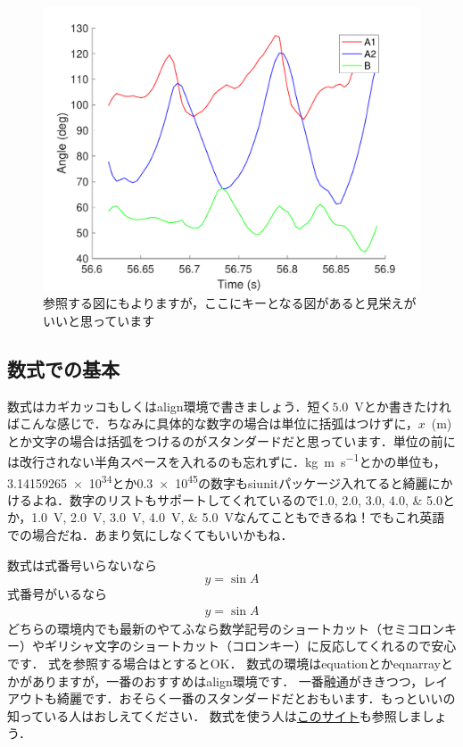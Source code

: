 \documentclass[platex,dvipdfmx]{jlreq}%
\numberwithin{equation}{section}%
\begin{document}
\begin{figure}[tb]
 \centering %
  \includegraphics[width=\columnwidth]{./figure/testfig.pdf}
  \caption{参照する図にもよりますが，ここにキーとなる図があると見栄えがいいと思っています}
  \label{fig:test}
\end{figure}

\subsection{数式での基本}

数式はカギカッコもしくはalign環境で書きましょう．短く$5.0$~Vとか書きたければこんな感じで．ちなみに具体的な数字の場合は単位に括弧はつけずに，$x$~(m)とか文字の場合は括弧をつけるのがスタンダードだと思っています．単位の前には改行されない半角スペースを入れるのも忘れずに．\si{kg.m.s^{-1}}とかの単位も，\num{3.14159265e34}とか\num{.3e45}の数字もsiunitパッケージ入れてると綺麗にかけるよね．数字のリストもサポートしてくれているので\numlist{ 1.0; 2.0; 3.0; 4.0; 5.0}とか，\SIlist{ 1.0; 2.0; 3.0; 4.0; 5.0}{\volt}なんてこともできるね！でもこれ英語での場合だね．あまり気にしなくてもいいかもね．

数式は式番号いらないなら
\[
 y=\sin{A}
\] 
式番号がいるなら
\begin{align}
 y=\sin{A}
 \label{eq:test}
\end{align}
どちらの環境内でも最新のやてふなら数学記号のショートカット（セミコロンキー）やギリシャ文字のショートカット（コロンキー）に反応してくれるので安心です．
式を参照する場合はとするとOK．
数式の環境はequationとかeqnarrayとかがありますが，一番のおすすめはalign環境です．
一番融通がききつつ，レイアウトも綺麗です．おそらく一番のスタンダードだとおもいます．もっといいの知っている人はおしえてください．
数式を使う人は\href{http://www.math.tohoku.ac.jp/~kuroki/LaTeX/howtolatex.html}{このサイト}も参照しましょう．
\end{document}
